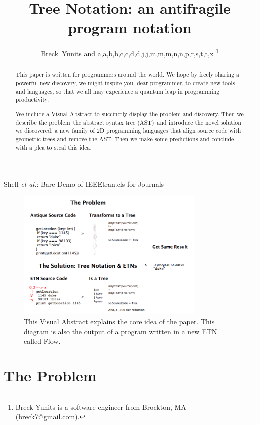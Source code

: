 \documentclass[journal]{IEEEtran}
\begin{document}
\title{Tree Notation: an antifragile program notation}

\author{Breck~Yunits and a,a,b,b,c,c,d,d,j,j,m,m,m,n,n,p,r,s,t,t,x%
\thanks{Breck Yunits is a software engineer from Brockton, MA (breck7@gmail.com).}%
}

%
{Shell \MakeLowercase{\textit{et al.}}: Bare Demo of IEEEtran.cls for Journals}

\maketitle


\begin{abstract}
This paper is written for programmers around the world. We hope by freely sharing a powerful new discovery, we might inspire you, dear programmer, to create new tools and languages, so that we all may experience a quantum leap in programming productivity.

We include a Visual Abstract to succinctly display the problem and discovery. Then we describe the problem--the abstract syntax tree (AST)--and introduce the novel solution we discovered: a new family of 2D programming languages that align source code with geometric trees and remove the AST. Then we make some predictions and conclude with a plea to steal this idea.
\end{abstract}

\IEEEpeerreviewmaketitle

\begin{figure}[ht!]
\centering
\includegraphics[width=90mm]{treenotation.png}
\caption{This Visual Abstract explains the core idea of the paper. This diagram is also the output of a program written in a new ETN called Flow.}
\end{figure}

\section{The Problem}
\end{document}

